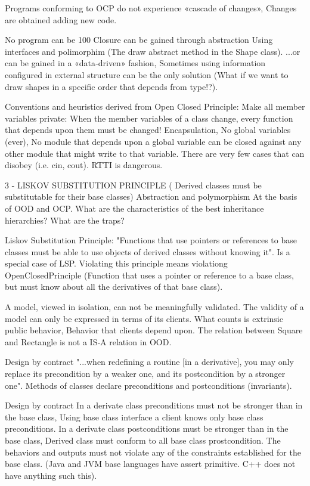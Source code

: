 \documentclass{report}
\begin{document}
Programs conforming to OCP do not experience «cascade of changes», 
Changes are obtained adding new code.

No program can be 100%
Closure can be gained through abstraction Using interfaces and polimorphim (The draw abstract method in the Shape class).
...or can be gained in a «data‐driven» fashion, Sometimes using information configured in external structure can be the only solution
(What if we want to draw shapes in a specific order that depends from type!?).

Conventions and heuristics derived from Open Closed Principle:
Make all member variables private: When the member variables of a class change, every function that depends upon them must be changed!
Encapsulation, No global variables (ever), No module that depends upon a global variable can be closed against any other module that might write to that variable. There are very few cases that can disobey (i.e. cin, cout). RTTI is dangerous.

3 - LISKOV SUBSTITUTION PRINCIPLE ( Derived classes must be substitutable for their base classes)
Abstraction and polymorphism At the basis of OOD and OCP. What are the characteristics of the best inheritance hierarchies? What are the traps?

Liskov Substitution Principle: "Functions that use pointers or references to base classes must be able to use objects of derived classes without knowing it". Is a special case of LSP.
Violating this principle means violationg OpenClosedPrinciple (Function that uses a pointer or reference to a base class, but must know about all the derivatives of that base class).

A model, viewed in isolation, can not be meaningfully validated. The validity of a model can only be expressed in terms of its clients. What counts is extrinsic public behavior, Behavior that clients depend upon. The relation between Square and Rectangle is not a IS‐A relation in OOD.

Design by contract "...when redefining a routine [in a derivative], you may only replace its precondition by a weaker one, and its postcondition by a stronger one". Methods of classes declare preconditions and postconditions (invariants).

Design by contract
In a derivate class preconditions must not be stronger than in the base class, Using base class interface a client knows only base class preconditions.
In a derivate class postconditions must be stronger than in the base class, Derived class must conform to all base class prostcondition.
The behaviors and outputs must not violate any of the constraints established for the base class.
(Java and JVM base languages have assert primitive. C++ does not have anything such this).
\end{document}
